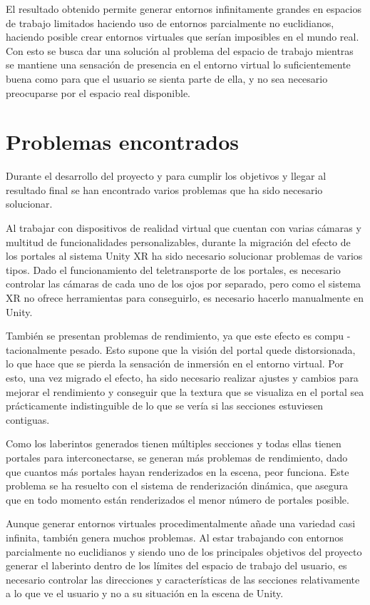 \documentclass[../main.tex]{subfiles}
\begin{document}
El resultado obtenido permite generar entornos infinitamente grandes en espacios de trabajo limitados haciendo uso de entornos parcialmente no euclidianos, haciendo posible crear entornos virtuales que serían imposibles en el mundo real. Con esto se busca dar una solución al problema del espacio de trabajo mientras se mantiene una sensación de presencia en el entorno virtual lo suficientemente buena como para que el usuario se sienta parte de ella, y no sea necesario preocuparse por el espacio real disponible.

\section{Problemas encontrados}

Durante el desarrollo del proyecto y para cumplir los objetivos y llegar al resultado final se han encontrado varios problemas que ha sido necesario solucionar.

Al trabajar con dispositivos de realidad virtual que cuentan con varias cámaras y multitud de funcionalidades personalizables, durante la migración del efecto de los portales al sistema Unity XR ha sido necesario solucionar problemas de varios tipos. Dado el funcionamiento del teletransporte de los portales, es necesario controlar las cámaras de cada uno de los ojos por separado, pero como el sistema XR no ofrece herramientas para conseguirlo, es necesario hacerlo manualmente en Unity.

También se presentan problemas de rendimiento, ya que este efecto es compu -tacionalmente pesado. Esto supone que la visión del portal quede distorsionada, lo que hace que se pierda la sensación de inmersión en el entorno virtual. Por esto, una vez migrado el efecto, ha sido necesario realizar ajustes y cambios para mejorar el rendimiento y conseguir que la textura que se visualiza en el portal sea prácticamente indistinguible de lo que se vería si las secciones estuviesen contiguas.

Como los laberintos generados tienen múltiples secciones y todas ellas tienen portales para interconectarse, se generan más problemas de rendimiento, dado que cuantos más portales hayan renderizados en la escena, peor funciona. Este problema se ha resuelto con el sistema de renderización dinámica, que asegura que en todo momento están renderizados el menor número de portales posible.

Aunque generar entornos virtuales procedimentalmente añade una variedad casi infinita, también genera muchos problemas. Al estar trabajando con entornos parcialmente no euclidianos y siendo uno de los principales objetivos del proyecto generar el laberinto dentro de los límites del espacio de trabajo del usuario, es necesario controlar las direcciones y características de las secciones relativamente a lo que ve el usuario y no a su situación en la escena de Unity. 
\end{document}
